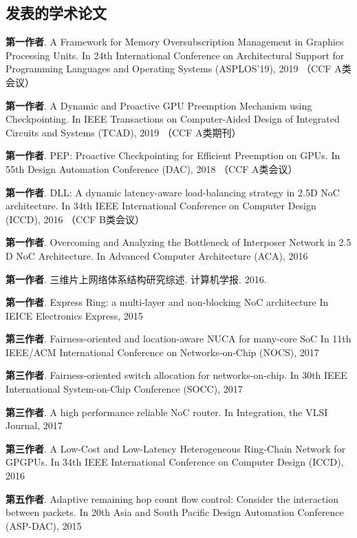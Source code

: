 \begin{resume}


\section*{发表的学术论文} %

  \begin{enumerate}[{[}1{]}]
  \addtolength{\itemsep}{-0.36\baselineskip}
  \settowidth{}
  \setlength{\labelsep}{0.4em}
  \setlength{\itemindent}{\labelwidth+\labelsep+0.4em}
  \setlength{\leftmargin}{0em}
  \addtolength{\itemsep}{-.36\baselineskip}%
  \item \textbf{第一作者}. A Framework for Memory Oversubscription Management in Graphics Processing Units.
        In 24th International Conference on Architectural Support for Programming Languages and Operating Systems (ASPLOS'19), 2019 （CCF A类会议）
  \item \textbf{第一作者}. A Dynamic and Proactive GPU Preemption Mechanism using Checkpointing.
        In IEEE Transactions on Computer-Aided Design of Integrated Circuits and Systems (TCAD), 2019 （CCF A类期刊）
  \item \textbf{第一作者}. PEP: Proactive Checkpointing for Efficient Preemption on GPUs.
        In 55th Design Automation Conference (DAC), 2018 （CCF A类会议）
  \item \textbf{第一作者}. DLL: A dynamic latency-aware load-balancing strategy in 2.5D NoC architecture.
        In 34th IEEE International Conference on Computer Design (ICCD), 2016 （CCF B类会议）
  \item \textbf{第一作者}. Overcoming and Analyzing the Bottleneck of Interposer Network in 2.5 D NoC Architecture.
        In Advanced Computer Architecture (ACA), 2016
  \item \textbf{第一作者}. 三维片上网络体系结构研究综述. 计算机学报. 2016.  
  \item \textbf{第一作者}. Express Ring: a multi-layer and non-blocking NoC architecture
        In IEICE Electronics Express, 2015
  \item \textbf{第三作者}. Fairness-oriented and location-aware NUCA for many-core SoC
        In 11th IEEE/ACM International Conference on Networks-on-Chip (NOCS), 2017
  \item \textbf{第三作者}. Fairness-oriented switch allocation for networks-on-chip.
        In 30th IEEE International System-on-Chip Conference (SOCC), 2017
  \item \textbf{第三作者}. A high performance reliable NoC router.
        In Integration, the VLSI Journal, 2017
  \item \textbf{第三作者}. A Low-Cost and Low-Latency Heterogeneous Ring-Chain Network for GPGPUs.
        In 34th IEEE International Conference on Computer Design (ICCD), 2016
  \item \textbf{第五作者}. Adaptive remaining hop count flow control: Consider the interaction between packets.
        In 20th Asia and South Pacific Design Automation Conference (ASP-DAC), 2015


\end{enumerate}
\end{resume}
